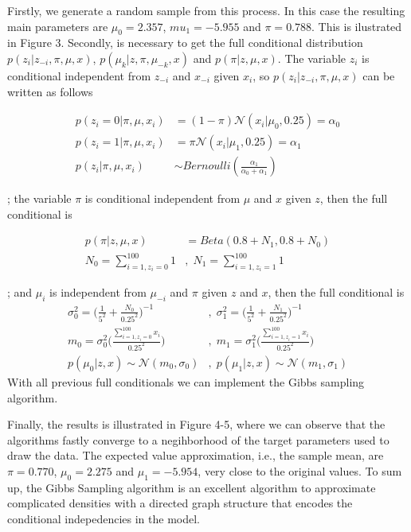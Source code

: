 \documentclass{article}
\begin{document}
Firstly, we generate a random sample from this process. In this case the resulting main parameters are $\mu_{0}=2.357$, $mu_{1}=-5.955$ and $\pi=0.788$. This is ilustrated in Figure 3. Secondly, is necessary to get the full conditional distribution $p(z_{i}|z_{-i}, \pi, \mu, x)$, $p(\mu_{k}|z, \pi, \mu_{-k}, x)$ and $p(\pi|z, \mu, x)$. The variable $z_{i}$ is conditional independent from $z_{-i}$ and $x_{-i}$ given $x_{i}$, so $p(z_{i}|z_{-i}, \pi, \mu, x)$ can be written as follows

\begin{align}
p(z_{i}=0|\pi, \mu, x_{i}) &=  (1-\pi) \mathcal{N}(x_{i}|\mu_{0}, 0.25) = \alpha_{0}\\
p(z_{i}=1|\pi, \mu, x_{i}) &=  \pi \mathcal{N}(x_{i}|\mu_{1}, 0.25) = \alpha_{1}\\
p(z_{i}|\pi, \mu, x_{i}) &\sim Bernoulli(\frac{\alpha_{1}}{\alpha_{0}+\alpha_{1}})
\end{align}

; the variable $\pi$ is conditional independent from $\mu$ and $x$ given $z$, then the full conditional is

\begin{align}
    p(\pi|z, \mu, x) &= Beta(0.8+N_{1}, 0.8+N_{0})\\
    N_{0} = \sum_{i=1, z_{i}=0}^{100}1&, \; N_{1} = \sum_{i=1, z_{i}=1}^{100}1
\end{align}

; and $\mu_{i}$ is independent from $\mu_{-i}$ and $\pi$ given $z$ and $x$, then the full conditional is
\begin{align}
    \sigma_{0}^{2} = \bigg(\frac{1}{5^{2}}+\frac{N_{0}}{0.25^{2}}\bigg)^{-1}&, \; \sigma_{1}^{2} = \bigg(\frac{1}{5^{2}}+\frac{N_{1}}{0.25^{2}}\bigg)^{-1}\\
    m_{0} = \sigma_{0}^{2}\bigg(\frac{\sum_{i=1, z_{i}=0}^{100}x_{i}}{0.25^{2}}\bigg)&, \; m_{1} = \sigma_{1}^{2}\bigg(\frac{\sum_{i=1, z_{i}=1}^{100}x_{i}}{0.25^{2}}\bigg)\\
    p(\mu_{0}|z, x) \sim \mathcal{N}(m_{0}, \sigma_{0}) &, \; p(\mu_{1}|z, x) \sim \mathcal{N}(m_{1}, \sigma_{1})
\end{align}
With all previous full conditionals we can implement the Gibbs sampling algorithm.


Finally, the results  is illustrated in Figure 4-5, where we can observe that the algorithms fastly converge to a negihborhood of the target parameters used to draw the data. The expected value approximation, i.e., the sample mean, are $\pi=0.770$, $\mu_{0}=2.275$ and $\mu_{1}=-5.954$, very close to the original values. To sum up, the Gibbs Sampling algorithm is an excellent algorithm to approximate complicated densities with a directed graph structure that encodes the conditional indepedencies in the model.
\end{document}
